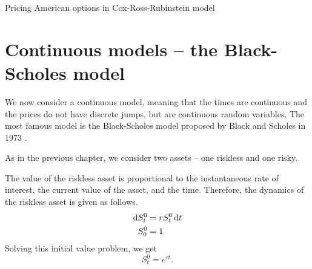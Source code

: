 \begin{algorithm}[H]
	\DontPrintSemicolon
	
	
	
	
	\caption{Pricing American options in Cox-Ross-Rubinstein model}
	\label{alg:discrete-am}
\end{algorithm}






\section{Continuous models -- the Black-Scholes model}
\label{sec:continuous}

We now consider a continuous model, meaning that the times are continuous and the prices do not have discrete jumps, but are continuous random variables. The most famous model is the Black-Scholes model proposed by Black and Scholes in 1973 \cite{Black1973}.

As in the previous chapter, we consider two assets -- one riskless and one risky.

The value of the riskless asset is proportional to the instantaneous rate of interest, the current value of the asset, and the time. Therefore, the dynamics of the riskless asset is given as follows.
\begin{align}
	\label{eq:continous-riskless-de}
	\dif S_t^0  &=  r S_t^0 \dif t  \\
	S_0^0  &=  1
\end{align}
Solving this initial value problem, we get
\begin{equation}
	\label{eq:continous-riskless-int}
	S_t^0 = e^{rt}.
\end{equation}


